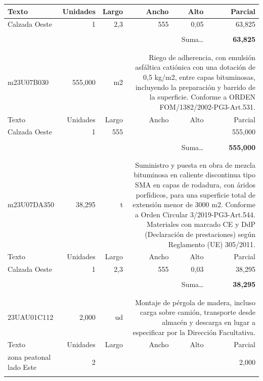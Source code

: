 \documentclass{book}%
\begin{document}
\begin{longtable}{lrrrrr}
Texto&Unidades&Largo&Ancho&Alto&Parcial\\%
\hline%
\multicolumn{1}{p{3.5cm}}{Calzada Oeste}&1&2,3&555&0,05&    63,825\\%
&&&&&\\%
\multicolumn{5}{r}{Suma\ldots}&\textbf{    63,825}\\%
\hline%
&&&&&\\%
&&&&&\\%
m23U07B030&   555,000& m2&\multicolumn{3}{p{6cm}}{\scriptsize Riego de adherencia, con emulsión asfáltica catiónica con una dotación de 0,5 kg/m2, entre capas bituminosas, incluyendo la preparación y barrido de la superficie. Conforme a ORDEN FOM/1382/2002-PG3-Art.531.\normalsize}\\%
Texto&Unidades&Largo&Ancho&Alto&Parcial\\%
\hline%
\multicolumn{1}{p{3.5cm}}{Calzada Oeste}&1&555&&&   555,000\\%
&&&&&\\%
\multicolumn{5}{r}{Suma\ldots}&\textbf{   555,000}\\%
\hline%
&&&&&\\%
&&&&&\\%
m23U07DA350&    38,295& t&\multicolumn{3}{p{6cm}}{\scriptsize Suministro y puesta en obra de mezcla bituminosa en caliente discontinua tipo SMA en capas de rodadura, con áridos porfídicos, para una superficie total de extensión menor de 3000 m2. Conforme a Orden Circular 3/2019-PG3-Art.544. Materiales con marcado CE y DdP (Declaración de prestaciones) según Reglamento (UE) 305/2011.\normalsize}\\%
Texto&Unidades&Largo&Ancho&Alto&Parcial\\%
\hline%
\multicolumn{1}{p{3.5cm}}{Calzada Oeste}&1&2,3&555&0,03&    38,295\\%
&&&&&\\%
\multicolumn{5}{r}{Suma\ldots}&\textbf{    38,295}\\%
\hline%
&&&&&\\%
&&&&&\\%
23UAU01C112&     2,000& ud&\multicolumn{3}{p{6cm}}{\scriptsize Montaje de pérgola de madera, incluso carga sobre camión, transporte desde almacén y descarga en lugar a especificar por la Dirección Facultativa.\normalsize}\\%
Texto&Unidades&Largo&Ancho&Alto&Parcial\\%
\hline%
\multicolumn{1}{p{3.5cm}}{ zona peatonal lado Este}&2&&&&     2,000\\%
&&&&&\\%

\end{longtable}
\end{document}
